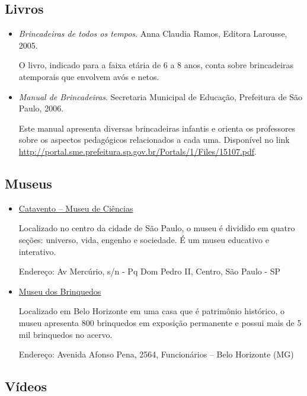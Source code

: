 \documentclass[11pt]{extarticle}
\begin{document}
\subsection{Livros}

\begin{itemize}

\item \textit{Brincadeiras de todos os tempos}. Anna Claudia Ramos, Editora Larousse, 2005.

O livro, indicado para a faixa etária de 6 a 8 anos, conta sobre brincadeiras atemporais que envolvem avós e netos.

\item \textit{Manual de Brincadeiras}. Secretaria Municipal de Educação, Prefeitura de São Paulo, 2006.

Este manual apresenta diversas brincadeiras infantis e orienta os professores sobre os aspectos pedagógicos relacionados a cada uma. Disponível no link \url{http://portal.sme.prefeitura.sp.gov.br/Portals/1/Files/15107.pdf}.

\end{itemize}

\subsection{Museus}

\begin{itemize}

\item \href{https://museucatavento.org.br/}{Catavento – Museu de Ciências}

Localizado no centro da cidade de São Paulo, o museu é dividido em quatro seções: universo, vida, engenho e sociedade. É um museu educativo e interativo.

Endereço: Av Mercúrio, s/n - Pq Dom Pedro II, Centro, São Paulo - SP

\item \href{http://www.museudosbrinquedos.org.br/}{Museu dos Brinquedos}

Localizado em Belo Horizonte em uma casa que é patrimônio histórico, o museu apresenta 800 brinquedos em exposição permanente e possui mais de 5 mil brinquedos no acervo.

Endereço: Avenida Afonso Pena, 2564, Funcionários – Belo Horizonte (MG)

\end{itemize}

\subsection{Vídeos}
\end{document}
